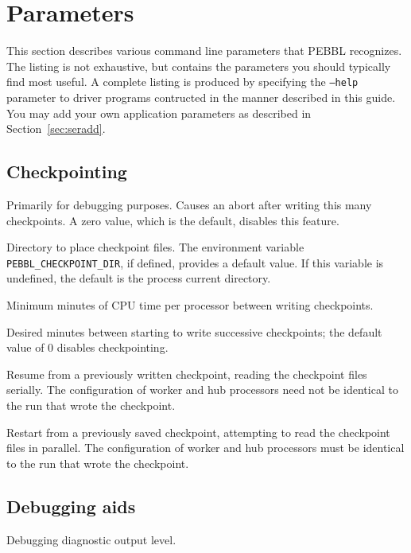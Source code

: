 \section{Parameters}
\label{sec:param}
This section describes various command line parameters that PEBBL
recognizes.  The listing is not exhaustive, but contains the
parameters you should typically find most useful.  A complete listing
is produced by specifying the \texttt{--help} parameter to driver
programs contructed in the manner described in this guide.  You may
add your own application parameters as described in Section~\ref{sec:seradd}.


\subsection{Checkpointing}
\vspace{-3ex}
 Primarily for
debugging purposes. Causes an abort after writing this many
checkpoints.  A zero value, which is the default, disables this feature.

 Directory to place checkpoint files.  The environment
variable \texttt{PEBBL\_CHECKPOINT\_DIR}, if defined, provides a
default value.  If this variable is undefined, the default is the process
current directory.

Minimum minutes of CPU time per processor between writing
checkpoints.  

Desired minutes between starting to write successive checkpoints; the default
value of $0$ disables checkpointing.

Resume from a previously written checkpoint, reading the checkpoint
files serially.  The configuration of worker and hub processors need
not be identical to the run that wrote the checkpoint.

 Restart from a previously saved
checkpoint, attempting to read the checkpoint files in parallel.  The
configuration of worker and hub processors must be identical to
the run that wrote the checkpoint.

\subsection{Debugging aids}
\vspace{-3ex}
Debugging diagnostic output level.

